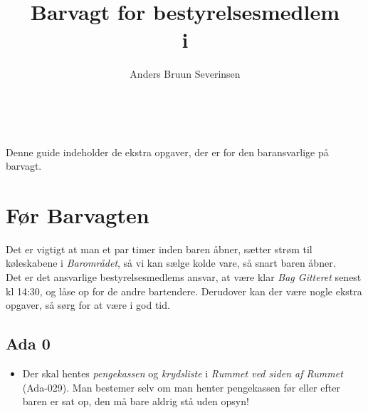 

\title{Barvagt for bestyrelsesmedlem\\ i \fredagscafeen}
\date{}
\author{Anders Bruun Severinsen}



\maketitle

\tableofcontents \

Denne guide indeholder de ekstra opgaver,
der er for den baransvarlige på barvagt.

\section{Før Barvagten}
\label{sec:pre-barvagten}
Det er vigtigt at man et par timer inden baren åbner, sætter strøm til køleskabene i
\textit{Barområdet}, så vi kan sælge kolde vare, så snart baren åbner.\\

Det er det ansvarlige bestyrelsesmedlems ansvar, at være klar \textit{Bag Gitteret} senest kl 14:30,
og låse op for de andre bartendere.
Derudover kan der være nogle ekstra opgaver, så sørg for at være i god tid.

\subsection{Ada 0}
\label{sec:pre:ada}

\begin{itemize}
    \item Der skal hentes \textit{pengekassen} og \textit{krydsliste} i \textit{Rummet ved siden af
    Rummet} (Ada-029). Man bestemer selv om man henter
    pengekassen før eller efter baren er sat op, den må bare aldrig stå uden opsyn!
\end{itemize}

